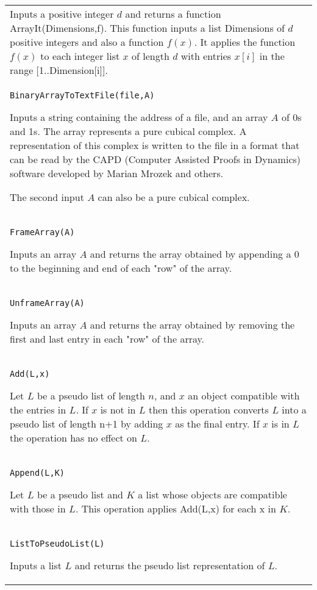 \documentclass[a4paper,11pt]{report}
\begin{document}
{\begin{center}
\begin{tabular}{|l|}
 Inputs a positive integer $d$ and returns a function ArrayIt(Dimensions,f). This function inputs a list
Dimensions of $d$ positive integers and also a function $f(x)$. It applies the function $f(x)$ to each integer list $x$ of length $d$ with entries $x[i]$ in the range [1..Dimension[i]]. \\
 \index{BinaryArrayToTextFile} \texttt{BinaryArrayToTextFile(file,A)} 

 Inputs a string containing the address of a file, and an array $A$ of 0s and 1s. The array represents a pure cubical complex. A representation of
this complex is written to the file in a format that can be read by the CAPD
(Computer Assisted Proofs in Dynamics) software developed by Marian Mrozek and
others. 

 The second input $A$ can also be a pure cubical complex. \\
 \index{FrameArray} \texttt{FrameArray(A)} 

 Inputs an array $A$ and returns the array obtained by appending a 0 to the beginning and end of
each "row" of the array. \\
 \index{UnframeArray} \texttt{UnframeArray(A)} 

 Inputs an array $A$ and returns the array obtained by removing the first and last entry in each
"row" of the array. \\
 \index{Add} \texttt{Add(L,x)} 

 Let $L$ be a pseudo list of length $n$, and $x$ an object compatible with the entries in $L$. If $x$ is not in $L$ then this operation converts $L$ into a pseudo list of length n+1 by adding $x$ as the final entry. If $x$ is in $L$ the operation has no effect on $L$. \\
 \index{Append} \texttt{Append(L,K)} 

 Let $L$ be a pseudo list and $K$ a list whose objects are compatible with those in $L$. This operation applies Add(L,x) for each x in $K$. \\
 \index{ListToPseudoList} \texttt{ListToPseudoList(L)} 

 Inputs a list $L$ and returns the pseudo list representation of $L$. \\
\end{tabular}\\[2mm]
\end{center}

 }

 
\end{document}
